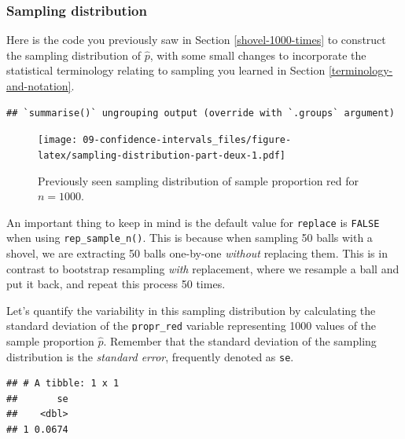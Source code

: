 \documentclass[
]{book}
\newenvironment{Shaded}{\begin{snugshade}}{\end{snugshade}}
\newcommand{\DataTypeTok}[1]{\textcolor[rgb]{0.13,0.29,0.53}{#1}}
\newcommand{\KeywordTok}[1]{\textcolor[rgb]{0.13,0.29,0.53}{\textbf{#1}}}
\newcommand{\NormalTok}[1]{#1}
\newcommand{\OperatorTok}[1]{\textcolor[rgb]{0.81,0.36,0.00}{\textbf{#1}}}
\newcommand{\StringTok}[1]{\textcolor[rgb]{0.31,0.60,0.02}{#1}}
\begin{document}
\hypertarget{sampling-distribution}{%
\subsubsection*{Sampling distribution}\label{sampling-distribution}}

Here is the code you previously saw in Section \ref{shovel-1000-times} to construct the sampling distribution of \(\widehat{p}\), with some small changes to incorporate the statistical terminology relating to sampling you learned in Section \ref{terminology-and-notation}.

\begin{verbatim}
## `summarise()` ungrouping output (override with `.groups` argument)
\end{verbatim}

\begin{figure}
\centering
\texttt{[image: 09-confidence-intervals\_files/figure-latex/sampling-distribution-part-deux-1.pdf]}
\caption{\label{fig:sampling-distribution-part-deux}Previously seen sampling distribution of sample proportion red for \(n = 1000\).}
\end{figure}

An important thing to keep in mind is the default value for \texttt{replace} is \texttt{FALSE} when using \texttt{rep\_sample\_n()}. This is because when sampling 50 balls with a shovel, we are extracting 50 balls one-by-one \emph{without} replacing them. This is in contrast to bootstrap resampling \emph{with} replacement, where we resample a ball and put it back, and repeat this process 50 times.

Let's quantify the variability in this sampling distribution by calculating the standard deviation of the \texttt{propr\_red} variable representing 1000 values of the sample proportion \(\widehat{p}\). Remember that the standard deviation of the sampling distribution is the \emph{standard error}, frequently denoted as \texttt{se}.

\begin{Shaded}
\end{Shaded}

\begin{verbatim}
## # A tibble: 1 x 1
##       se
##    <dbl>
## 1 0.0674
\end{verbatim}
\end{document}
